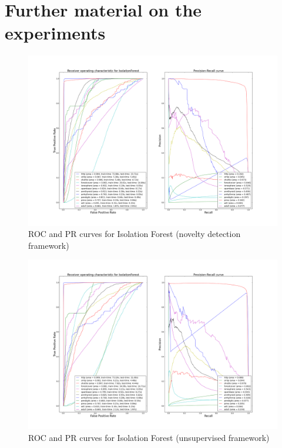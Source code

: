 % 
% 

\clearpage
\section{Further material on the experiments}
\begin{figure}[!ht]
  \centering
  \caption{ROC and PR curves for Isolation Forest (novelty detection framework)}
  \label{evaluation:fig:iforest_roc_pr}
  \includegraphics[trim=175 80 175 98, clip, width=0.98\linewidth]{fig_source/evaluation_fig/bench_iforest_roc_pr_supervised_factorized.png}
\end{figure}

\begin{figure}[!ht]
  \centering
  \label{evaluation:fig:iforest_roc_pr_unsupervised}
  \caption{ROC and PR curves for Isolation Forest (unsupervised framework)}
  \includegraphics[trim=175 80 175 98, clip, width=0.98\linewidth]{fig_source/evaluation_fig/bench_iforest_roc_pr_unsupervised_factorized.png}
\end{figure}

